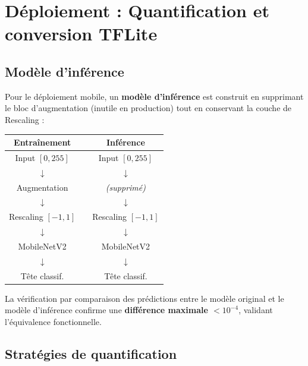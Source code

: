 \documentclass[12pt, a4paper, twoside]{report}
\begin{document}


\chapter{Déploiement : Quantification et conversion TFLite}
\label{chap:deploiement}

\section{Modèle d'inférence}

Pour le déploiement mobile, un \textbf{modèle d'inférence} est construit en supprimant le bloc d'augmentation (inutile en production) tout en conservant la couche de Rescaling :

\begin{center}
\begin{tabular}{ccc}
\textbf{Entraînement} & & \textbf{Inférence} \\
\midrule
Input $[0,255]$ & & Input $[0,255]$ \\
$\downarrow$ & & $\downarrow$ \\
\colorbox{yellow!20}{Augmentation} & & \textit{(supprimé)} \\
$\downarrow$ & & $\downarrow$ \\
Rescaling $[-1,1]$ & & Rescaling $[-1,1]$ \\
$\downarrow$ & & $\downarrow$ \\
MobileNetV2 & & MobileNetV2 \\
$\downarrow$ & & $\downarrow$ \\
Tête classif. & & Tête classif. \\
\end{tabular}
\end{center}

La vérification par comparaison des prédictions entre le modèle original et le modèle d'inférence confirme une \textbf{différence maximale $< 10^{-4}$}, validant l'équivalence fonctionnelle.

\section{Stratégies de quantification}
\end{document}
